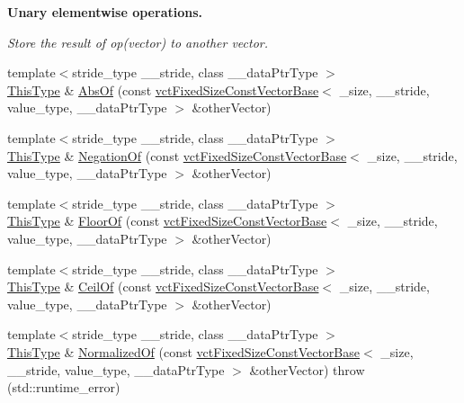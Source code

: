 \begin{Indent}{\bf Unary elementwise operations.}\par
{\em Store the result of op(vector) to another vector. }\begin{DoxyCompactItemize}
\item 
{\footnotesize template$<$stride\+\_\+type \+\_\+\+\_\+stride, class \+\_\+\+\_\+data\+Ptr\+Type $>$ }\\\hyperlink{classvct_fixed_size_const_vector_base_a071063bc4fa43112cc287b2dbef53180}{This\+Type} \& \hyperlink{classvct_fixed_size_vector_base_a1ae580bac81c0dcfc7da8397f1756fd1}{Abs\+Of} (const \hyperlink{classvct_fixed_size_const_vector_base}{vct\+Fixed\+Size\+Const\+Vector\+Base}$<$ \+\_\+size, \+\_\+\+\_\+stride, value\+\_\+type, \+\_\+\+\_\+data\+Ptr\+Type $>$ \&other\+Vector)
\item 
{\footnotesize template$<$stride\+\_\+type \+\_\+\+\_\+stride, class \+\_\+\+\_\+data\+Ptr\+Type $>$ }\\\hyperlink{classvct_fixed_size_const_vector_base_a071063bc4fa43112cc287b2dbef53180}{This\+Type} \& \hyperlink{classvct_fixed_size_vector_base_a4533462c7bb10d5b04a450fc024d076a}{Negation\+Of} (const \hyperlink{classvct_fixed_size_const_vector_base}{vct\+Fixed\+Size\+Const\+Vector\+Base}$<$ \+\_\+size, \+\_\+\+\_\+stride, value\+\_\+type, \+\_\+\+\_\+data\+Ptr\+Type $>$ \&other\+Vector)
\item 
{\footnotesize template$<$stride\+\_\+type \+\_\+\+\_\+stride, class \+\_\+\+\_\+data\+Ptr\+Type $>$ }\\\hyperlink{classvct_fixed_size_const_vector_base_a071063bc4fa43112cc287b2dbef53180}{This\+Type} \& \hyperlink{classvct_fixed_size_vector_base_a13053455b81e4b5c15094fa9b6524176}{Floor\+Of} (const \hyperlink{classvct_fixed_size_const_vector_base}{vct\+Fixed\+Size\+Const\+Vector\+Base}$<$ \+\_\+size, \+\_\+\+\_\+stride, value\+\_\+type, \+\_\+\+\_\+data\+Ptr\+Type $>$ \&other\+Vector)
\item 
{\footnotesize template$<$stride\+\_\+type \+\_\+\+\_\+stride, class \+\_\+\+\_\+data\+Ptr\+Type $>$ }\\\hyperlink{classvct_fixed_size_const_vector_base_a071063bc4fa43112cc287b2dbef53180}{This\+Type} \& \hyperlink{classvct_fixed_size_vector_base_ac43670d4e45b7e9e6f67ea98fe0cd89b}{Ceil\+Of} (const \hyperlink{classvct_fixed_size_const_vector_base}{vct\+Fixed\+Size\+Const\+Vector\+Base}$<$ \+\_\+size, \+\_\+\+\_\+stride, value\+\_\+type, \+\_\+\+\_\+data\+Ptr\+Type $>$ \&other\+Vector)
\item 
{\footnotesize template$<$stride\+\_\+type \+\_\+\+\_\+stride, class \+\_\+\+\_\+data\+Ptr\+Type $>$ }\\\hyperlink{classvct_fixed_size_const_vector_base_a071063bc4fa43112cc287b2dbef53180}{This\+Type} \& \hyperlink{classvct_fixed_size_vector_base_a80358993cd1e1c4207346aa43a6ce090}{Normalized\+Of} (const \hyperlink{classvct_fixed_size_const_vector_base}{vct\+Fixed\+Size\+Const\+Vector\+Base}$<$ \+\_\+size, \+\_\+\+\_\+stride, value\+\_\+type, \+\_\+\+\_\+data\+Ptr\+Type $>$ \&other\+Vector)  throw (std\+::runtime\+\_\+error)
\end{DoxyCompactItemize}
\end{Indent}
